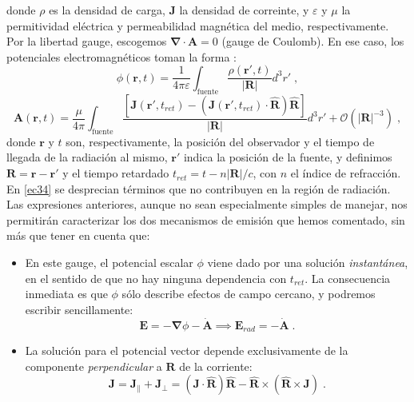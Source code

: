 \documentclass[11 pt, a4paper]{article} %
\numberwithin{equation}{section}
\numberwithin{figure}{section}
\numberwithin{table}{section}
\newcommand{\vect}[1]{\boldsymbol{\mathbf{#1}}}
\begin{document}
donde $\rho$ es la densidad de carga, $\vect{J}$ la densidad de correinte, y $\varepsilon$ y $\mu$ la permitividad eléctrica y permeabilidad magnética del medio, respectivamente. Por la libertad gauge, escogemos $\vect{\nabla}\cdot \vect{A}=0$ (gauge de Coulomb). En ese caso, los potenciales electromagnéticos toman la forma \cite{Jackson2002}:
\begin{equation}
	\phi(\vect{r}, t)=\frac{1}{4\pi\varepsilon}\int_{\text{fuente}} \frac{\rho(\vect{r}', t)}{\left|\vect{R}\right|}d^3r'\;,\label{ec33}
\end{equation}
\begin{equation}
	\vect{A}\left(\vect{r}, t\right)=\frac{\mu}{4\pi}\int_{\text{fuente}}\frac{\left[\vect{J}\left(\vect{r}', t_{ret}\right)-\left(\vect{J}\left(\vect{r}', t_{ret}\right)\cdot \hat{\vect{R}}\right)\hat{\vect{R}}\right]}{\left|\vect{R}\right|}d^3r'+\mathcal{O}(\left|\vect{R}\right|^{-3})\;,\label{ec34}
\end{equation}
donde $\vect{r}$ y $t$ son, respectivamente, la posición del observador y el tiempo de llegada de la radiación al mismo, $\vect{r}'$ indica la posición de la fuente, y definimos $\vect{R}=\vect{r}-\vect{r}'$ y el tiempo retardado $t_{ret}=t-n\left|\vect{R}\right|/c$, con $n$ el índice de refracción. En \eqref{ec34} se desprecian términos que no contribuyen en la región de radiación. Las expresiones anteriores, aunque no sean especialmente simples de manejar, nos permitirán caracterizar los dos mecanismos de emisión que hemos comentado, sin más que tener en cuenta que:
\begin{itemize}
	\item En este gauge, el potencial escalar $\phi$ viene dado por una solución \textit{instantánea}, en el sentido de que no hay ninguna dependencia con $t_{ret}$. La consecuencia inmediata es que $\phi$ sólo describe efectos de campo cercano, y podremos escribir sencillamente:
	\begin{equation}
		\vect{E}=-\vect{\nabla}\phi-\dot{\vect{A}}\implies \vect{E}_{rad} = -\dot{\vect{A}}\;.\label{ec35}
	\end{equation}
\item La solución para el potencial vector depende exclusivamente de la componente \textit{perpendicular} a $\vect{R}$ de la corriente:
\begin{equation}
	\vect{J}=\vect{J}_\parallel+\vect{J}_\perp = \left(\vect{J}\cdot\hat{\vect{R}}\right)\hat{\vect{R}}-\hat{\vect{R}}\times\left(\hat{\vect{R}}\times\vect{J}\right)\;.\label{ec36}
\end{equation} 
\end{itemize}
\end{document}
